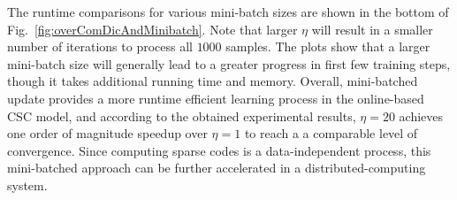 The runtime comparisons for various mini-batch sizes are shown in the
bottom of Fig.~\ref{fig:overComDicAndMinibatch}. Note that larger
$\eta$ will result in a smaller number of iterations to process all
$1000$ samples. The plots show that a larger mini-batch size will
generally lead to a greater progress in first few training steps,
though it takes additional running time and memory. Overall,
mini-batched update provides a more runtime efficient learning
process in the online-based CSC model, and according to the obtained
experimental results, $\eta=20$ achieves one order of magnitude
speedup over $\eta=1$ to reach a a comparable level of
convergence. Since computing sparse codes is a data-independent
process, this mini-batched approach can be further accelerated in a
distributed-computing system.




